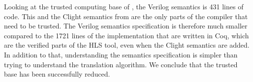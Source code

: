 Looking at the trusted computing base of \vericert{}, the Verilog semantics is 431 lines of code.  This and the Clight semantics from \compcert{} are the only parts of the compiler that need to be trusted.  The Verilog semantics specification is therefore much smaller compared to the 1721 lines of the implementation that are written in Coq, which are the verified parts of the HLS tool, even when the Clight semantics are added.  In addition to that, understanding the semantics specification is simpler than trying to understand the translation algorithm. We conclude that the trusted base has been successfully reduced.


